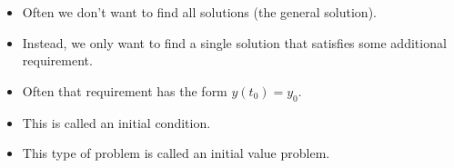 \begin{frame}
\begin{itemize}
\item  Often we don't want to find all solutions (the general solution).
\item  Instead, we only want to find a single solution that satisfies some additional requirement.
\item  Often that requirement has the form $y(t_0) = y_0$.
\item  This is called an initial condition.
\item  This type of problem is called an initial value problem.
\end{itemize}
\end{frame}
